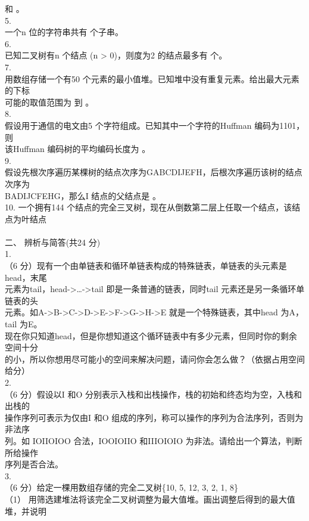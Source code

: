 \begin{question}
和        。\\
5.\\
一个n 位的字符串共有                    个子串。\\
6.\\
已知二叉树有n 个结点 (n > 0)，则度为2 的结点最多有            个。\\
7.\\
用数组存储一个有50 个元素的最小值堆。已知堆中没有重复元素。给出最大元素的下标\\
可能的取值范围为           到          。\\
8.\\
假设用于通信的电文由5 个字符组成。已知其中一个字符的Huffman 编码为1101，则\\
该Huffman 编码树的平均编码长度为           。\\
9.\\
假设先根次序遍历某棵树的结点次序为GABCDIJEFH，后根次序遍历该树的结点次序为\\
BADIJCFEHG，那么I 结点的父结点是            。\\
10. 一个拥有144 个结点的完全三叉树，现在从倒数第二层上任取一个结点，该结点为叶结点\\
\\
二、 辨析与简答(共24 分)\\
1.\\
（6 分）现有一个由单链表和循环单链表构成的特殊链表，单链表的头元素是head，末尾\\
元素为tail，head->…->tail 即是一条普通的链表，同时tail 元素还是另一条循环单链表的头\\
元素。如A->B->C->D->E->F->G->H->E 就是一个特殊链表，其中head 为A，tail 为E。\\
现在你只知道head，但是你想知道这个循环链表中有多少元素，但同时你的剩余空间十分\\
的小，所以你想用尽可能小的空间来解决问题，请问你会怎么做？（依据占用空间给分）\\
2.\\
（6 分）假设以I 和O 分别表示入栈和出栈操作，栈的初始和终态均为空，入栈和出栈的\\
操作序列可表示为仅由I 和O 组成的序列，称可以操作的序列为合法序列，否则为非法序\\
列。如 IOIIOIOO 合法，IOOIOIIO 和IIIOIOIO 为非法。请给出一个算法，判断所给操作\\
序列是否合法。\\
3.\\
（6 分）给定一棵用数组存储的完全二叉树\{10, 5, 12, 3, 2, 1, 8\}\\
（1） 用筛选建堆法将该完全二叉树调整为最大值堆。画出调整后得到的最大值堆，并说明\\

\end{question}

